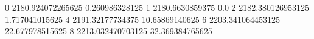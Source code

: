 0 2180.924072265625 0.260986328125
1 2180.6630859375 0.0
2 2182.380126953125 1.717041015625
4 2191.32177734375 10.65869140625
6 2203.341064453125 22.677978515625
8 2213.032470703125 32.369384765625
